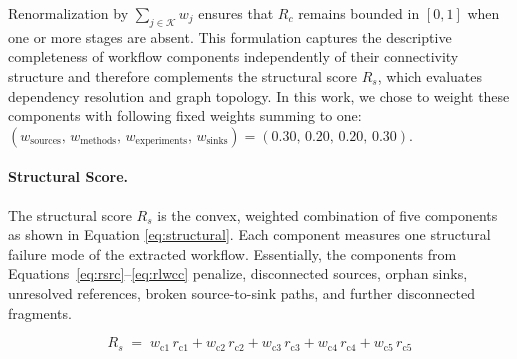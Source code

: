 \documentclass{article}
\begin{document}
%
Renormalization by $\sum_{j\in \mathcal{K}} w_j$ ensures that $R_c$ remains bounded in $[0,1]$ when one or more stages are absent.
This formulation captures the descriptive completeness of workflow components independently of their connectivity structure and therefore complements the structural score $R_s$, which evaluates dependency resolution and graph topology.
In this work, we chose to weight these components with following fixed weights summing to one: $(w_{\text{sources}},\,w_{\text{methods}},\,w_{\text{experiments}},\,w_{\text{sinks}}) = (0.30,\,0.20,\,0.20,\,0.30)$.


\paragraph{Structural Score.} 
The structural score $R_s$ is the convex, weighted combination of five components as shown in Equation \eqref{eq:structural}.
Each component measures one structural failure mode of the extracted workflow.    
Essentially, the components from Equations~\eqref{eq:rsrc}--\eqref{eq:rlwcc} penalize, disconnected sources, orphan sinks, unresolved references, broken source-to-sink paths, and further disconnected fragments.

\begin{equation}                                              
  R_s \;=\; w_{\mathrm{c1}}\,r_{\mathrm{c1}} + w_{\mathrm{c2}}\,r_{\mathrm{c2}} + w_{\mathrm{c3}}\,r_{\mathrm{c3}} + w_{\mathrm{c4}}\,r_{\mathrm{c4}} + w_{\mathrm{c5}}\,r_{\mathrm{c5}}
  \label{eq:structural}                             
\end{equation}
\end{document}
